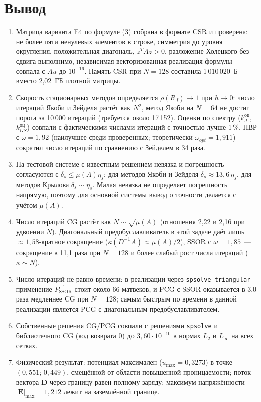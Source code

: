 \documentclass[12pt]{article}
\begin{document}
\section{Вывод}

\begin{enumerate}
  \item Матрица варианта E4 по формуле (3) собрана в формате CSR и проверена: не более пяти ненулевых элементов в строке, симметрия до уровня округления, положительная диагональ, $z^TAz>0$, разложение Холецкого без сдвига выполнимо, независимая векторизованная реализация формулы совпала с $Au$ до $10^{-16}$. Память CSR при $N=128$ составила 1\,010\,020~Б вместо 2,02~ГБ плотной матрицы.
  \item Скорость стационарных методов определяется $\rho(R_J)\to1$ при $h\to0$: число итераций Якоби и Зейделя растёт как $N^2$, метод Якоби на $N=64$ не достиг порога за 10\,000 итераций (требуется около 17\,152). Оценки по спектру ($k_J^\text{оц}$, $k_{GS}^\text{оц}$) совпали с фактическими числами итераций с точностью лучше 1\,\%. ПВР с $\omega=1{,}92$ (наилучшее среди проверенных; теоретически $\omega_{opt}=1{,}911$) сократил число итераций по сравнению с Зейделем в 34 раза.
  \item На тестовой системе с известным решением невязка и погрешность согласуются с $\delta_s\le\mu(A)\eta_s$; для методов Якоби и Зейделя $\delta_s\approx 13,6\,\eta_s$, для методов Крылова $\delta_s\sim\eta_s$. Малая невязка не определяет погрешность напрямую, поэтому для основной системы вывод о точности делается с учётом $\mu(A)$.
  \item Число итераций CG растёт как $N\sim\sqrt{\mu(A)}$ (отношения 2,22 и 2,16 при удвоении $N$). Диагональный предобуславливатель в этой задаче даёт лишь $\approx1,58$-кратное сокращение ($\kappa(D^{-1}A)\approx\mu(A)/2$), SSOR с $\omega=1{,}85$~--- сокращение в 11,1 раза при $N=128$ и более слабый рост числа итераций ($\kappa\sim N$).
  \item Число итераций не равно времени: в реализации через \texttt{spsolve\_triangular} применение $P_\text{SSOR}^{-1}$ стоит около 66 матвеков, и PCG с SSOR оказывается в 3,0 раза медленнее CG при $N=128$; самым быстрым по времени в данной реализации является PCG с диагональным предобуславливателем.
  \item Собственные решения CG/PCG совпали с решениями \texttt{spsolve} и библиотечного CG (код возврата 0) до $3{,}60\cdot10^{-10}$ в нормах $L_2$ и $L_\infty$ на всех сетках.
  \item Физический результат: потенциал максимален ($u_{\max}=0{,}3273$) в точке $(0{,}551;\,0{,}449)$, смещённой от области повышенной проницаемости; поток вектора $\mathbf D$ через границу равен полному заряду; максимум напряжённости $|\mathbf E|_{\max}=1{,}212$ лежит на заземлённой границе.
\end{enumerate}
\end{document}
